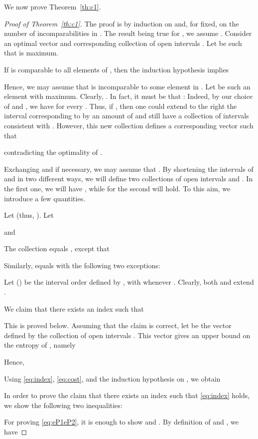 \documentclass{article} \usepackage{fullpage}
\begin{document}
We now prove Theorem~\ref{th:c1}.

\begin{proof}[Proof of Theorem~\ref{th:c1}]
The proof is by induction on  and, for  fixed, on the number of incomparabilities in . The result being true for , we assume . Consider an optimal vector  and corresponding collection of open intervals .
Let  be such that  is maximum.

If  is comparable to all elements of , then the induction hypothesis implies


Hence, we may assume that  is incomparable to some element in . Let  be such an element
with  maximum. Clearly, .
In fact, it must be that : Indeed, by our choice of  and ,
we have  for every . Thus, if ,
then one could extend to the right the interval corresponding to 
by an amount of  and still
have a collection of intervals consistent with . However, this new collection
defines a corresponding vector  such that

contradicting the optimality of .

Exchanging  and  if necessary, we may assume that .
By shortening the intervals of  and  in two different ways,
we will define two collections of open intervals
 and .
In the first one, we will have , while for the second  will hold. To this aim, we introduce a few quantities.

Let  (thus, ).
Let

and

The collection  equals
, except that

Similarly,  equals
 with the following two exceptions:



Let  () be the interval order defined by , with  whenever .
Clearly, both  and  extend .

We claim that there exists an index  such that

This is proved below. Assuming that the claim is correct, let  be the vector defined by the collection
of open intervals .
This vector gives an upper bound on the entropy of , namely

Hence,


Using \eqref{eq:index}, \eqref{eq:cost}, and the induction hypothesis on ,
we obtain



In order to prove the claim that there exists an index  such that \eqref{eq:index} holds, we show the following two inequalities:


For proving \eqref{eq:eP1eP2}, it is enough to show
 and .
By definition of  and , we have


\end{proof}
\end{document}
